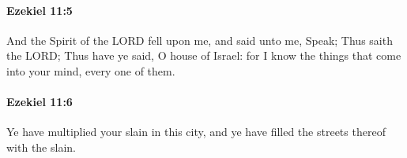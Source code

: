 		\paragraph{Ezekiel 11:5} %
			\label{EZEKIEL-11-5}

			And the Spirit of the LORD fell upon me, and said unto me, Speak; Thus saith the LORD; Thus have ye said, O house of Israel: for I know the things that come into your mind, every one of them.


		\paragraph{Ezekiel 11:6} %
			\label{EZEKIEL-11-6}

			Ye have multiplied your slain in this city, and ye have filled the streets thereof with the slain.


